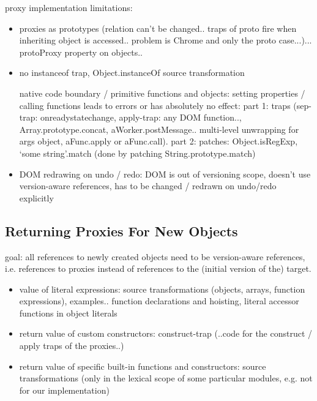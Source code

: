proxy implementation limitations: 
\begin{itemize}
    \item proxies as prototypes (relation can’t be changed.. traps of proto fire when inheriting object is accessed.. problem is Chrome and only the proto case...)... protoProxy property on objects..
    \item no instanceof trap, Object.instanceOf source transformation 
    \item [native code] boundary / primitive functions and objects: setting properties / calling functions leads to errors or has absolutely no effect: part 1: traps (sep-trap: onreadystatechange, apply-trap: any DOM function.., Array.prototype.concat, aWorker.postMessage.. multi-level unwrapping for args object, aFunc.apply or aFunc.call).
part 2: patches: Object.isRegExp, ‘some string’.match (done by patching String.prototype.match)
\end{itemize}


\begin{itemize}
    \item DOM redrawing on undo / redo: DOM is out of versioning scope, doesn’t use version-aware references, has to be changed / redrawn on undo/redo explicitly
\end{itemize}




\subsection{Returning Proxies For New Objects}

goal: all references to newly created objects need to be version-aware references, i.e. references to proxies instead of references to the (initial version of the) target. 

\begin{itemize}
    \item value of literal expressions: source transformations (objects, arrays, function expressions), examples.. function declarations and hoisting, literal accessor functions in object literals
    \item return value of custom constructors: construct-trap (..code for the construct / apply traps of the proxies..)
    \item return value of specific built-in functions and constructors: source transformations (only in the lexical scope of some particular modules, e.g. not for our implementation)
\end{itemize}

